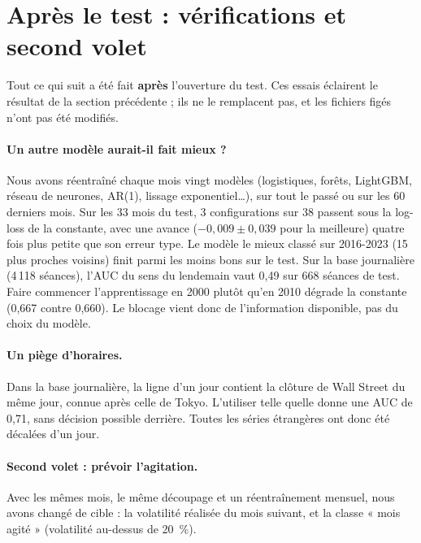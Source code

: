 \section{Après le test : vérifications et second volet}

Tout ce qui suit a été fait \textbf{après} l'ouverture du test. Ces essais éclairent le résultat de la section
précédente ; ils ne le remplacent pas, et les fichiers figés n'ont pas été modifiés.

\paragraph{Un autre modèle aurait-il fait mieux ?} Nous avons réentraîné chaque mois vingt modèles (logistiques,
forêts, LightGBM, réseau de neurones, AR(1), lissage exponentiel\ldots), sur tout le passé ou sur les 60 derniers mois.
Sur les 33 mois du test, 3 configurations sur 38 passent sous la log-loss de la constante, avec une avance
($-0{,}009 \pm 0{,}039$ pour la meilleure) quatre fois plus petite que son erreur type. Le modèle le mieux classé sur
2016-2023 (15 plus proches voisins) finit parmi les moins bons sur le test. Sur la base journalière (4\,118 séances),
l'AUC du sens du lendemain vaut 0,49 sur 668 séances de test. Faire commencer l'apprentissage en 2000 plutôt qu'en 2010
dégrade la constante (0,667 contre 0,660). Le blocage vient donc de l'information disponible, pas du choix du modèle.

\paragraph{Un piège d'horaires.} Dans la base journalière, la ligne d'un jour contient la clôture de Wall Street du
même jour, connue après celle de Tokyo. L'utiliser telle quelle donne une AUC de 0,71, sans décision possible derrière.
Toutes les séries étrangères ont donc été décalées d'un jour.

\paragraph{Second volet : prévoir l'agitation.} Avec les mêmes mois, le même découpage et un réentraînement mensuel,
nous avons changé de cible : la volatilité réalisée du mois suivant, et la classe « mois agité » (volatilité au-dessus
de 20~\%).

